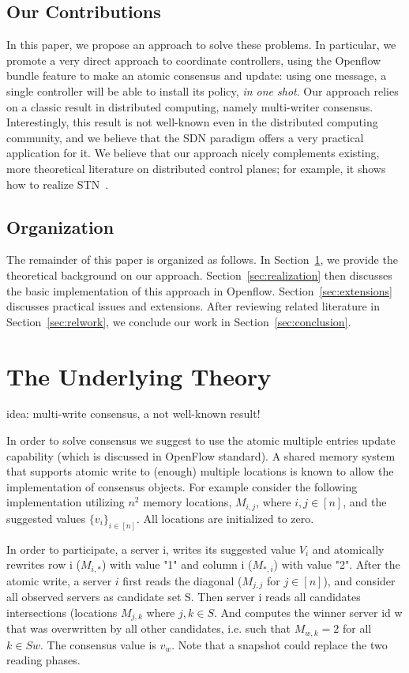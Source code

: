 \documentclass[conference]{sigcomm-alternate}
\begin{document}
\subsection{Our Contributions}

In this paper, we propose an approach to solve these problems.
In particular, we promote a very direct approach to coordinate controllers,
using the Openflow bundle feature to make an atomic consensus and update:
using one message, a single controller will be able to install its policy,
\emph{in one shot}. Our approach relies on a classic result in 
distributed computing, namely multi-writer consensus. Interestingly,
this result is not well-known even in the distributed computing community,
and we believe that the SDN paradigm offers a very practical
application for it. We believe that our approach nicely complements
existing, more theoretical literature on distributed control planes; for example,
it shows how to realize STN~\cite{stn}.

\subsection{Organization}

The remainder of this paper is organized as follows.
In Section~\ref{sec:background}, we provide the theoretical
background on our approach. Section~\ref{sec:realization}
then discusses the basic implementation of this approach in Openflow.
Section~\ref{sec:extensions} discusses practical issues and extensions.
After reviewing related literature in Section~\ref{sec:relwork},
we conclude our work in
Section~\ref{sec:conclusion}.


\section{The Underlying Theory}\label{sec:background}

idea: multi-write consensus, a not well-known result!

In order to solve consensus we suggest to use the atomic multiple entries update capability (which is discussed in OpenFlow standard). A shared memory system that supports atomic write to (enough) multiple locations is known to allow the implementation of consensus objects. For example consider the following implementation utilizing $n^2$ memory locations, $M_{i,j}$, where $i,j\in[n]$, and the suggested values $\{v_i\}_{i\in [n]}$. All locations are initialized to zero.

In order to participate, a server i, writes its suggested value $V_i$ and atomically rewrites row i ($M_{i,*}$) with value "1" and column i ($M_{*,i}$) with value "2". After the atomic write, a server $i$ first reads the diagonal ($M_{j,j}$ for $j\in [n]$), and consider all observed servers as candidate set S.  Then server i reads all candidates intersections (locations $M_{j,k}$ where $j,k\in S$. And computes the winner server id w that was overwritten by all other candidates, i.e. such that $M_{w,k}=2$ for all $k\in S {w}$. The consensus value is $v_w$.
Note that a snapshot could replace the two reading phases.
\end{document}
